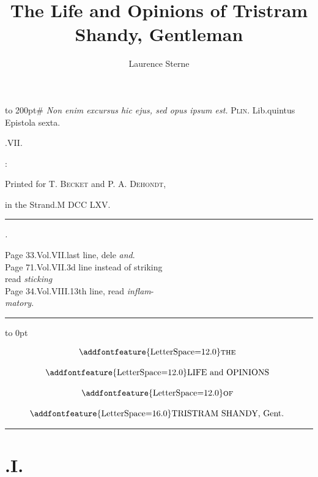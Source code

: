\documentclass{article}
\title{The Life and Opinions of Tristram Shandy, Gentleman}
\author{Laurence Sterne}
\begin{document}
\pagestyle{empty}
\vbox{\openup 10pt}
\vfill
\vbox{\openup -2pt\halign to 200pt{\footnotesize #\cr
\textit{Non enim excursus hic ejus, sed opus ipsum est.}\hfill\cr
\hfill \textsc{Plin.} Lib.\@ quintus Epistola sexta.\cr}}
\vfill
\centerline{.\quad VII.}
\vfill
\centerline{:}
\centerline{\small Printed for T. \textsc{Becket} and P. A. \textsc{Dehondt},}
\centerline{\small in the Strand.\quad M DCC LXV.}

\newpage
\null
\vfill
\bgroup\small
\hrule
\bigskip

\centerline{\itshape{}.}

\noindent
Page 33.\@ Vol.\@ VII.\@ last line, dele \textit{and}.\\[2pt]
Page 71.\@ Vol.\@ VII.\@ 3d line instead of striking\\[2pt]
\null\quad read \textit{sticking}\\[2pt]
Page 34.\@ Vol.\@ VIII.\@ 13th line, read \textit{inflam}-\\[2pt]
\null\quad \textit{matory}.

\bigskip
\hrule
\egroup
\vfill
\newpage
\pagestyle{fancy}
\thispagestyle{empty}
\setcounter{page}{1}
\hbox{}\vskip -36pt
\moveright 88pt\vbox to 0pt{\hsize
40pt\vss}

\[\vbox{\openup 12pt\halign{\hss # \hss\cr
\addfontfeature{LetterSpace=12.0}\textsc{the}\cr
\addfontfeature{LetterSpace=12.0}LIFE and OPINIONS\cr
\addfontfeature{LetterSpace=12.0}\textsc{of}\cr
{\addfontfeature{LetterSpace=16.0}TRISTRAM SHANDY}, Gent.\cr}}\]

\vskip 12pt
\hrule

\setlength{\baselineskip}{14pt}  %
\sloppy





\section{.\enspace I.}
\end{document}
